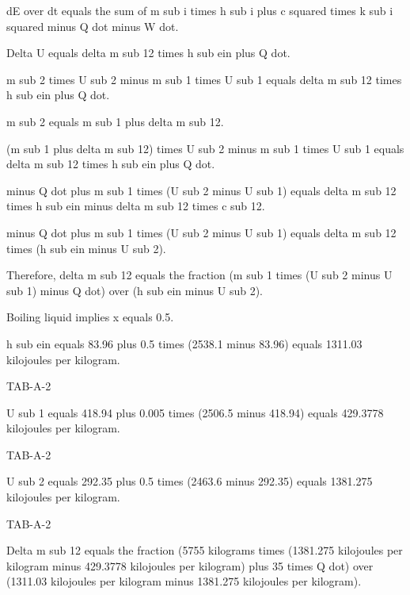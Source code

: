 dE over dt equals the sum of m sub i times h sub i plus c squared times k sub i squared minus Q dot minus W dot.

Delta U equals delta m sub 12 times h sub ein plus Q dot.

m sub 2 times U sub 2 minus m sub 1 times U sub 1 equals delta m sub 12 times h sub ein plus Q dot.

m sub 2 equals m sub 1 plus delta m sub 12.

(m sub 1 plus delta m sub 12) times U sub 2 minus m sub 1 times U sub 1 equals delta m sub 12 times h sub ein plus Q dot.

minus Q dot plus m sub 1 times (U sub 2 minus U sub 1) equals delta m sub 12 times h sub ein minus delta m sub 12 times c sub 12.

minus Q dot plus m sub 1 times (U sub 2 minus U sub 1) equals delta m sub 12 times (h sub ein minus U sub 2).

Therefore, delta m sub 12 equals the fraction (m sub 1 times (U sub 2 minus U sub 1) minus Q dot) over (h sub ein minus U sub 2).

Boiling liquid implies x equals 0.5.

h sub ein equals 83.96 plus 0.5 times (2538.1 minus 83.96) equals 1311.03 kilojoules per kilogram.

TAB-A-2

U sub 1 equals 418.94 plus 0.005 times (2506.5 minus 418.94) equals 429.3778 kilojoules per kilogram.

TAB-A-2

U sub 2 equals 292.35 plus 0.5 times (2463.6 minus 292.35) equals 1381.275 kilojoules per kilogram.

TAB-A-2

Delta m sub 12 equals the fraction (5755 kilograms times (1381.275 kilojoules per kilogram minus 429.3778 kilojoules per kilogram) plus 35 times Q dot) over (1311.03 kilojoules per kilogram minus 1381.275 kilojoules per kilogram).